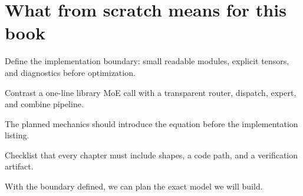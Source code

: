\section{What from scratch means for this book}
\label{sec:ch01-what-from-scratch-means-for-this-book}

Define the implementation boundary: small readable modules, explicit tensors, and diagnostics before optimization.



Contrast a one-line library MoE call with a transparent router, dispatch, expert, and combine pipeline.



The planned mechanics should introduce the equation before the implementation listing.





\begin{checkpointbox}
Checklist that every chapter must include shapes, a code path, and a verification artifact.
\end{checkpointbox}

With the boundary defined, we can plan the exact model we will build.
